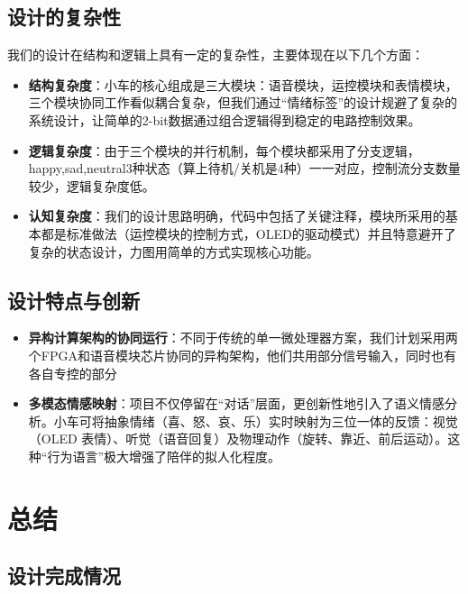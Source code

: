 \documentclass[12pt,a4paper]{ctexart}
\begin{document}
\subsection{设计的复杂性}
我们的设计在结构和逻辑上具有一定的复杂性，主要体现在以下几个方面：
\begin{itemize}
    \item \textbf{结构复杂度}：小车的核心组成是三大模块：语音模块，运控模块和表情模块，三个模块协同工作看似耦合复杂，但我们通过“情绪标签”的设计规避了复杂的系统设计，让简单的2-bit数据通过组合逻辑得到稳定的电路控制效果。
    \item \textbf{逻辑复杂度}：由于三个模块的并行机制，每个模块都采用了分支逻辑，happy,sad,neutral3种状态（算上待机/关机是4种）一一对应，控制流分支数量较少，逻辑复杂度低。
    \item \textbf{认知复杂度}：我们的设计思路明确，代码中包括了关键注释，模块所采用的基本都是标准做法（运控模块的控制方式，OLED的驱动模式）并且特意避开了复杂的状态设计，力图用简单的方式实现核心功能。
\end{itemize}

\subsection{设计特点与创新}

\begin{itemize}
    \item \textbf{异构计算架构的协同运行}：不同于传统的单一微处理器方案，我们计划采用两个FPGA和语音模块芯片协同的异构架构，他们共用部分信号输入，同时也有各自专控的部分
    \item \textbf{多模态情感映射}：项目不仅停留在“对话”层面，更创新性地引入了语义情感分析。小车可将抽象情绪（喜、怒、哀、乐）实时映射为三位一体的反馈：视觉（OLED 表情）、听觉（语音回复）及物理动作（旋转、靠近、前后运动）。这种“行为语言”极大增强了陪伴的拟人化程度。
\end{itemize}


\section{总结}

\subsection{设计完成情况}
\end{document}
